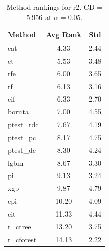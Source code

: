 \begin{table}[h]
\centering
\caption{Method rankings for r2. CD = 5.956 at $\alpha=0.05$.}
\label{tab:ranks_r2}
\begin{tabular}{lcc}
\toprule
Method & Avg Rank & Std \\
\midrule
cat & 4.33 & 2.44 \\
et & 5.53 & 3.48 \\
rfe & 6.00 & 3.65 \\
rf & 6.13 & 3.16 \\
cif & 6.33 & 2.70 \\
boruta & 7.00 & 4.55 \\
ptest_rdc & 7.67 & 4.19 \\
ptest_pc & 8.17 & 4.75 \\
ptest_dc & 8.30 & 4.24 \\
lgbm & 8.67 & 3.30 \\
pi & 9.13 & 3.24 \\
xgb & 9.87 & 4.79 \\
cpi & 10.20 & 4.09 \\
cit & 11.33 & 4.44 \\
r_ctree & 13.20 & 3.75 \\
r_cforest & 14.13 & 2.22 \\
\bottomrule
\end{tabular}
\end{table}